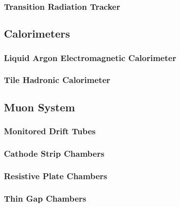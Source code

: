 		\subsubsection{Transition Radiation Tracker}\label{sssec:TRT}

	\subsection{Calorimeters}\label{ssec:calorimeters}

		\subsubsection{Liquid Argon Electromagnetic Calorimeter}\label{sssec:LAr}

		\subsubsection{Tile Hadronic Calorimeter}\label{sssec:Tile}

	\subsection{Muon System}\label{ssec:muon-system}

		\subsubsection{Monitored Drift Tubes}\label{sssec:MDT}

		\subsubsection{Cathode Strip Chambers}\label{sssec:CST}

		\subsubsection{Resistive Plate Chambers}\label{sssec:RPC}

		\subsubsection{Thin Gap Chambers}\label{sssec:TGC}


		